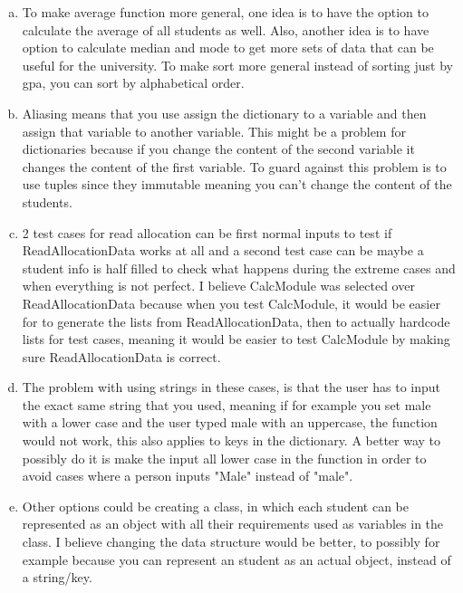 \documentclass[12pt]{article}
\begin{document}
\begin{enumerate}[(a)]

\item 
To make average function more general, one idea is to have the option to calculate the average of all students as well. Also, another idea is to have option to calculate median and mode to get more sets of data that can be useful for the university. To make sort more general instead of sorting just by gpa, you can sort by alphabetical order.

\item
Aliasing means that you use assign the dictionary to a variable and then assign that variable to another variable. This might be a problem for dictionaries because if you change the content of the second variable it changes the content of the first variable. To guard against this problem is to use tuples since they immutable meaning you can't change the content of the students.

\item 
2 test cases for read allocation can be first normal inputs to test if ReadAllocationData works at all and a second test case can be maybe a student info is half filled to check what happens during the extreme cases and when everything is not perfect. I believe CalcModule was selected over ReadAllocationData because when you test CalcModule, it would be easier for to generate the lists from ReadAllocationData, then to actually hardcode lists for test cases, meaning it would be easier to test CalcModule by making sure ReadAllocationData is correct. 


\item
The problem with using strings in these cases, is that the user has to input the exact same string that you used, meaning if for example you set male with a lower case and the user typed male with an uppercase, the function would not work, this also applies to keys in the dictionary. A better way to possibly do it is make the input all lower case in the function in order to avoid cases where a person inputs "Male" instead of "male". 

\item

Other options could be creating a class, in which each student can be represented as an object with all their requirements used as variables in the class. I believe changing the data structure would be better, to possibly for example because you can represent an student as an actual object, instead of a string/key.


\end{enumerate}
\end{document}
